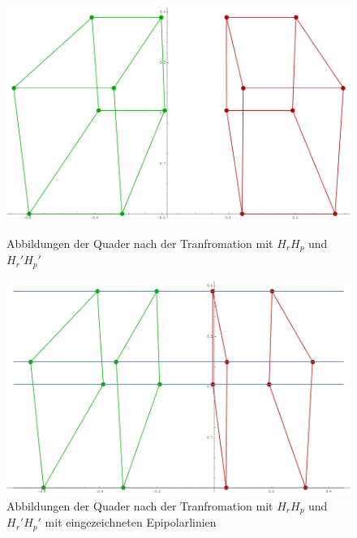 
\begin{figure}[!htb]
	\includegraphics[width=\linewidth]{images/Rectification_HrHp_same_Solutions.png}
	\caption[$H_rH_p$ und $H_r'H_p'$ Transformation]{Abbildungen der Quader nach der Tranfromation mit $H_rH_p$ und $H_r'H_p'$}
	\label{fig:RectSameHrHp1}
	\endminipage\hfill
	\includegraphics[width=\linewidth]{images/Rectification_HrHp_same_Solutions_Lines.png}
	\caption[$H_rH_p$ und $H_r'H_p'$ Transformation mit Epipolarlinien]{Abbildungen der Quader nach der Tranfromation mit $H_rH_p$ und $H_r'H_p'$ mit eingezeichneten Epipolarlinien}
	\label{fig:RectSameHrHp2}
	\endminipage\hfill
\end{figure}


